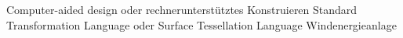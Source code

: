 

\begin{acronym}

 {Computer-aided design oder rechnerunterstütztes Konstruieren}
 {Standard Transformation Language oder Surface Tessellation Language}
 {Windenergieanlage}

\end{acronym}
